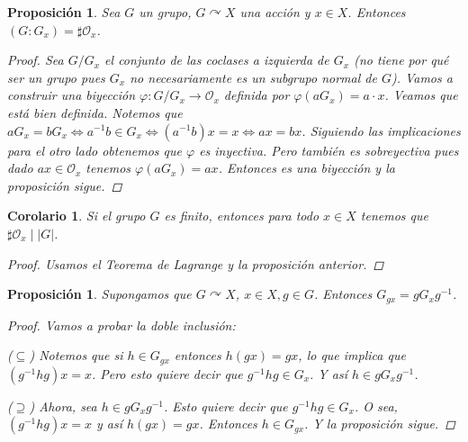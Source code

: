 \documentclass[12pt]{book}
\newtheorem{prop}[teo]{Proposición}
\newtheorem{cor}[teo]{Corolario}
\theoremstyle{definition}
\def\acts{\curvearrowright}
\begin{document}
\begin{prop}
Sea $G$ un grupo, $G\acts X$ una acción y $x\in X$. Entonces $(G:G_x) = \sharp \mathcal{O}_x$.
\begin{proof}
Sea $G/G_x$ el conjunto de las coclases a izquierda de $G_x$ (no tiene por qué ser un grupo pues $G_x$ no necesariamente es un subgrupo normal de $G$). Vamos a construir una biyección $\varphi :G/G_x \to \mathcal{O}_x$ definida por $\varphi(aG_x) = a\cdot x$. Veamos que está bien definida. Notemos que $aG_x = bG_x \Longleftrightarrow a^{-1}b\in G_x\Longleftrightarrow (a^{-1}b)x=x \Longleftrightarrow ax = bx$. Siguiendo las implicaciones para el otro lado obtenemos que $\varphi$ es inyectiva. Pero también es sobreyectiva pues dado $ax\in\mathcal{O}_x$ tenemos $\varphi (aG_x) = ax$. Entonces es una biyección y la proposición sigue.
\end{proof}
\end{prop}
\begin{cor}
Si el grupo $G$ es finito, entonces para todo $x\in X$ tenemos que $\sharp\mathcal{O}_x\mid |G|$.
\begin{proof}
Usamos el Teorema de Lagrange y la proposición anterior.
\end{proof}
\end{cor}
\begin{prop}
Supongamos que $G\acts X$, $x\in X, g\in G$. Entonces $G_{gx} = g G_x g^{-1}$.
\begin{proof}
Vamos a probar la doble inclusión:

($\subseteq$) Notemos que si $h\in G_{gx}$ entonces $h(gx) = gx$, lo que implica que $(g^{-1}hg) x = x$. Pero esto quiere decir que $g^{-1}hg\in G_x$. Y así $h\in gG_xg^{-1}$.

($\supseteq$) Ahora, sea $h\in g G_x g^{-1}$. Esto quiere decir que $g^{-1}hg\in G_x$. O sea, $(g^{-1}hg)x = x$ y así $h(gx) = gx$. Entonces $h\in G_{gx}$. Y la proposición sigue.

\end{proof}
\end{prop}
\end{document}

